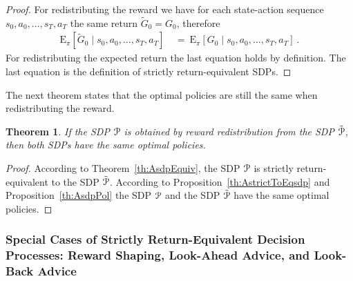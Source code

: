 \documentclass{article}
\newtheorem{theoremA}{Theorem}
\newcommand\EXP{\mathbf{\mathrm{E}}}
\begin{document}
\begin{appendices}
\begin{proof}
For redistributing the reward we have for 
each state-action sequence $s_0,a_0,\ldots,s_T,a_T$ the same return
$\tilde{G}_0 = G_0$, therefore  
\begin{align}
   \EXP_{\pi} \left[
    \tilde{G}_0 \mid s_0,a_0,\ldots,s_T,a_T \right] \ &= \
   \EXP_{\pi} \left[
    G_0 \mid s_0,a_0,\ldots,s_T, a_T\right] \ .
\end{align}
For redistributing the expected return the last equation holds 
by definition.
The last equation is the definition of 
strictly return-equivalent SDPs.
\end{proof}

The next theorem states that the optimal policies are still the same 
when redistributing the reward.
\begin{theoremA}
\label{th:AEquivT}
If the SDP $\mathcal{P}$ is obtained by reward redistribution from the 
SDP $\tilde{\mathcal{P}}$, then both SDPs have the same optimal policies.
\end{theoremA}


\begin{proof}
\label{c:t1p}
According to Theorem~\ref{th:AsdpEquiv}, 
the SDP $\mathcal{P}$ is strictly return-equivalent to the SDP $\tilde{\mathcal{P}}$.
According to Proposition~\ref{th:AstrictToEqsdp} and Proposition~\ref{th:AsdpPol}
the SDP $\mathcal{P}$ and the SDP $\tilde{\mathcal{P}}$ have  
the same optimal policies. 
\end{proof}





\subsubsection{Special Cases of Strictly Return-Equivalent Decision Processes: 
  Reward Shaping, Look-Ahead Advice, and Look-Back Advice}
\label{sec:AshapingEquiv}


\end{appendices}
\end{document}

